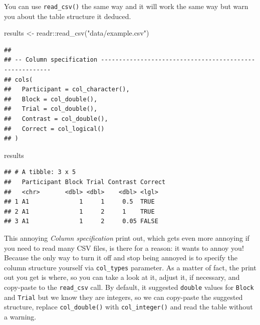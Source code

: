 \documentclass[
]{book}
\newenvironment{Shaded}{\begin{snugshade}}{\end{snugshade}}
\newcommand{\FunctionTok}[1]{\textcolor[rgb]{0.00,0.00,0.00}{#1}}
\newcommand{\NormalTok}[1]{#1}
\newcommand{\OtherTok}[1]{\textcolor[rgb]{0.56,0.35,0.01}{#1}}
\newcommand{\SpecialCharTok}[1]{\textcolor[rgb]{0.00,0.00,0.00}{#1}}
\newcommand{\StringTok}[1]{\textcolor[rgb]{0.31,0.60,0.02}{#1}}
\begin{document}
You can use \texttt{read\_csv()} the same way and it will work the same way but warn you about the table structure it deduced.

\begin{Shaded}
\begin{Highlighting}[]
\NormalTok{results }\OtherTok{\textless{}{-}}\NormalTok{ readr}\SpecialCharTok{::}\FunctionTok{read\_csv}\NormalTok{(}\StringTok{"data/example.csv"}\NormalTok{)}
\end{Highlighting}
\end{Shaded}

\begin{verbatim}
## 
## -- Column specification --------------------------------------------------------
## cols(
##   Participant = col_character(),
##   Block = col_double(),
##   Trial = col_double(),
##   Contrast = col_double(),
##   Correct = col_logical()
## )
\end{verbatim}

\begin{Shaded}
\begin{Highlighting}[]
\NormalTok{results}
\end{Highlighting}
\end{Shaded}

\begin{verbatim}
## # A tibble: 3 x 5
##   Participant Block Trial Contrast Correct
##   <chr>       <dbl> <dbl>    <dbl> <lgl>  
## 1 A1              1     1     0.5  TRUE   
## 2 A1              1     2     1    TRUE   
## 3 A1              1     2     0.05 FALSE
\end{verbatim}

This annoying \emph{Column specification} print out, which gets even more annoying if you need to read many CSV files, is there for a reason: it wants to annoy you! Because the only way to turn it off and stop being annoyed is to specify the column structure yourself via \texttt{col\_types} parameter. As a matter of fact, the print out you get is where, so you can take a look at it, adjust it, if necessary, and copy-paste to the \texttt{read\_csv} call. By default, it suggested \texttt{double} values for \texttt{Block} and \texttt{Trial} but we know they are integers, so we can copy-paste the suggested structure, replace \texttt{col\_double()} with \texttt{col\_integer()} and read the table without a warning.
\end{document}
